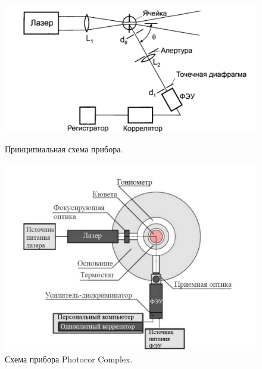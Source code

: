 \documentclass{article}
\begin{document}
\begin{figure}[!htb] 
            \includegraphics[width=1.3\linewidth]{Images/ДВА.png}
                 \caption{Принципиальная схема прибора.}
        \endminipage\hfill
             \includegraphics[width=0.88\linewidth]{Images/ОДИН.png}
                 \caption{Схема прибора Photocor Complex.}
        \endminipage
\end{figure}
\end{document}
